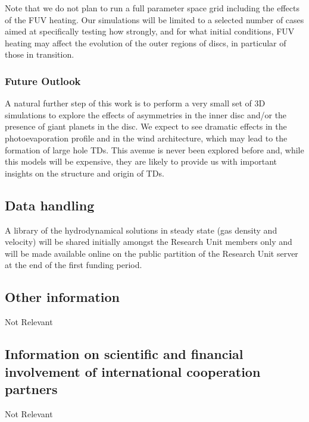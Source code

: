 \documentclass[10pt,fleqn,twoside]{article}
\newcommand{\Tcol}{\color{blue}}
\begin{document}
Note that we do not plan to run a full
parameter space grid including the effects of the FUV heating. 
Our simulations will be limited to a selected number of cases
aimed at specifically testing how strongly, and for what initial
conditions, FUV heating may affect the evolution of the outer regions
of discs, in particular of those in transition.\\

\subsubsection{Future Outlook}

A natural further step of this work is to perform a very small set of 3D
simulations to explore the effects of asymmetries in the inner
disc and/or the presence of giant planets in the disc. We expect to
see dramatic effects in the photoevaporation 
profile and in the wind architecture, which may lead to the formation
of large hole TDs. This avenue is never been explored before and,
while this models will be expensive, they are likely to provide us
with important insights on the structure and origin of TDs. \\ 



\subsection{\Tcol Data handling}

A library of the hydrodynamical solutions in steady state (gas density
and velocity)  will be shared initially amongst the Research Unit
members only and will be made available online on the public partition
of the Research Unit server at the end of the first funding period. 

\subsection{\Tcol Other information}

Not Relevant

\subsection{\Tcol Information on scientific and financial involvement of international cooperation partners}

Not Relevant
\end{document}
